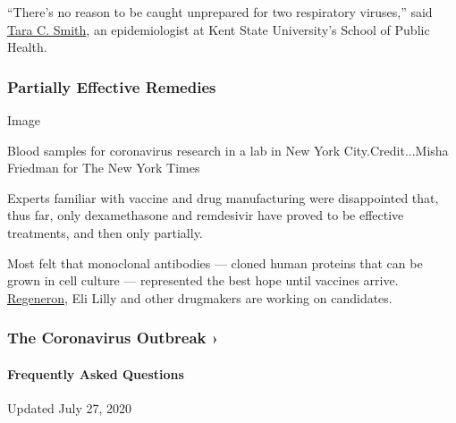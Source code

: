 ``There's no reason to be caught unprepared for two respiratory
viruses,'' said
\href{https://www.kent.edu/publichealth/profile/tara-c-smith-phd}{Tara
C. Smith}, an epidemiologist at Kent State University's School of Public
Health.

\hypertarget{partially-effective-remedies}{%
\subsubsection{Partially Effective
Remedies}\label{partially-effective-remedies}}

Image

Blood samples for coronavirus research in a lab in New York
City.Credit...Misha Friedman for The New York Times

Experts familiar with vaccine and drug manufacturing were disappointed
that, thus far, only dexamethasone and remdesivir have proved to be
effective treatments, and then only partially.

Most felt that monoclonal antibodies --- cloned human proteins that can
be grown in cell culture --- represented the best hope until vaccines
arrive.
\href{https://www.nytimes.com/2020/07/09/health/regeneron-monoclonal-antibodies.html}{Regeneron},
Eli Lilly and other drugmakers are working on candidates.

\href{https://www.nytimes.com/news-event/coronavirus?action=click\&pgtype=Article\&state=default\&region=MAIN_CONTENT_3\&context=storylines_faq}{}

\hypertarget{the-coronavirus-outbreak-}{%
\subsubsection{The Coronavirus Outbreak
›}\label{the-coronavirus-outbreak-}}

\hypertarget{frequently-asked-questions}{%
\paragraph{Frequently Asked
Questions}\label{frequently-asked-questions}}

Updated July 27, 2020

